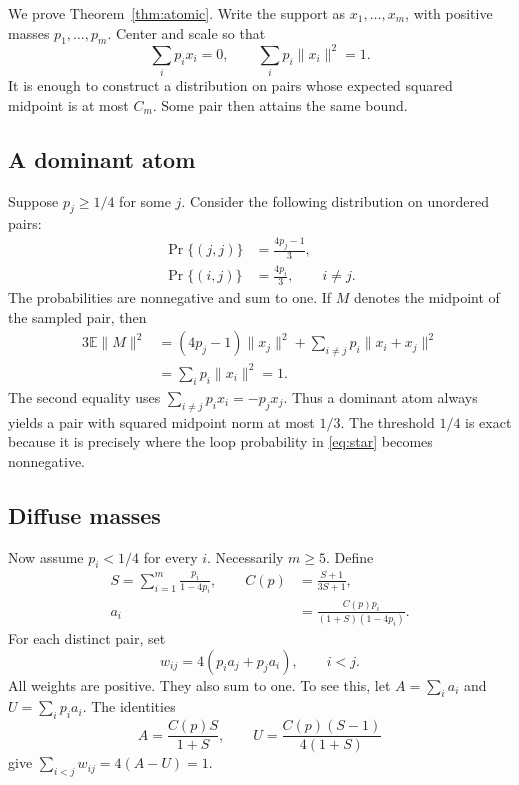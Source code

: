 \documentclass[twoside]{article}
\newcommand{\E}{\mathbb E}
\begin{document}
We prove Theorem~\ref{thm:atomic}. Write the support as $x_1,\ldots,x_m$, with positive masses $p_1,\ldots,p_m$. Center and scale so that
\begin{equation}\label{eq:normalization}
 \sum_i p_i x_i=0,
 \qquad
 \sum_i p_i\|x_i\|^2=1.
\end{equation}
It is enough to construct a distribution on pairs whose expected squared midpoint is at most $C_m$. Some pair then attains the same bound.

\subsection{A dominant atom}

Suppose $p_j\geq1/4$ for some $j$. Consider the following distribution on unordered pairs:
\begin{align}\label{eq:star}
 \Pr\{(j,j)\}&=\frac{4p_j-1}{3},\\
 \Pr\{(i,j)\}&=\frac{4p_i}{3},\qquad i\ne j.
\end{align}
The probabilities are nonnegative and sum to one. If $M$ denotes the midpoint of the sampled pair, then
\begin{align*}
 3\E\|M\|^2
 &=(4p_j-1)\|x_j\|^2
   +\sum_{i\ne j}p_i\|x_i+x_j\|^2\\
 &=\sum_i p_i\|x_i\|^2=1.
\end{align*}
The second equality uses $\sum_{i\ne j}p_i x_i=-p_jx_j$. Thus a dominant atom always yields a pair with squared midpoint norm at most $1/3$. The threshold $1/4$ is exact because it is precisely where the loop probability in \eqref{eq:star} becomes nonnegative.

\subsection{Diffuse masses}

Now assume $p_i<1/4$ for every $i$. Necessarily $m\geq5$. Define
\begin{align}\label{eq:SCalpha}
 S=\sum_{i=1}^m\frac{p_i}{1-4p_i},
 \qquad C(p)&=\frac{S+1}{3S+1},\\
 a_i&=\frac{C(p)p_i}{(1+S)(1-4p_i)}.
\end{align}
For each distinct pair, set
\begin{equation}\label{eq:complete-coupling}
 w_{ij}=4(p_i a_j+p_j a_i),\qquad i<j.
\end{equation}
All weights are positive. They also sum to one. To see this, let $A=\sum_i a_i$ and $U=\sum_i p_i a_i$. The identities \[ A=\frac{C(p)S}{1+S}, \qquad U=\frac{C(p)(S-1)}{4(1+S)} \] give $\sum_{i<j}w_{ij}=4(A-U)=1$.
\end{document}
